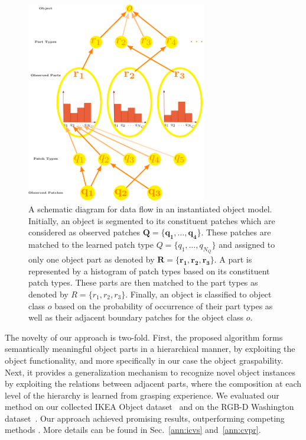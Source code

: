 \documentclass[a4paper,11pt,pdf]{pacmanreport}
\begin{document}
\begin{figure}[h!]
\begin{center}
\includegraphics[width=0.7\textwidth,height=0.4\textheight]{rel4.pdf}
\end{center}
\caption{A schematic diagram for data flow in an instantiated object model. Initially, an object is segmented to its constituent patches which are considered as observed patches $\mathbf{Q}=\{\mathbf{q_1},\ldots,\mathbf{q_4}\}$. These patches are matched to the learned patch type $Q=\{q_1,\ldots,q_{N_{Q}}\}$ and assigned to only one object part as denoted by $\mathbf{R}=\{\mathbf{r_1},\mathbf{r_2},\mathbf{r_3}\}$. A part is represented by a histogram of patch types based on its constituent patch types. These parts are then matched to the part types as denoted by $R=\{r_1,r_2,r_3\}$. Finally, an object is classified to object class $o$ based on the probability of occurrence of their part types as well as their adjacent boundary patches for the object class $o$.} 
\label{fig:rel3}
\end{figure}

The novelty of our approach is two-fold. First, the proposed algorithm forms semantically meaningful object parts in a hierarchical manner, by exploiting the object functionality, and more specifically in our case the object graspability. Next, it provides a generalization mechanism to recognize novel object instances by exploiting the relations between adjacent parts, where the composition at each level of the hierarchy is learned from grasping experience. We evaluated our method on our collected IKEA Object dataset~\cite{website} and on the RGB-D Washington dataset~\cite{rgbd-dataset}. Our approach achieved promising results, outperforming competing methods \cite{rel7}.
More details can be found in Sec.~\ref{ann:icvs} and~\ref{ann:cvpr}. %
\end{document}
